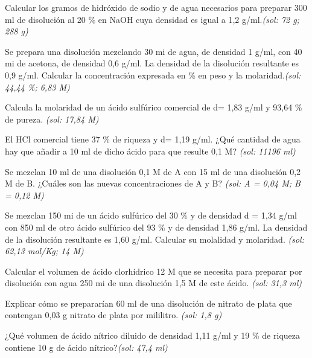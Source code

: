 \begin{multicols}{2}
\begin{problem}
Calcular los gramos de hidróxido de sodio y de agua necesarios para preparar 300 ml de disolución al 20 \% en NaOH cuya densidad es igual a 1,2 g/ml.\textit{\scriptsize(sol: 72 g; 288 g)}	
\end{problem}
\begin{problem}
Se prepara una disolución mezclando 30 mi de agua, de densidad 1 g/ml, con 40 mi de acetona, de densidad 0,6 g/ml. La densidad de la disolución resultante es 0,9 g/ml. Calcular la concentración expresada en \% en peso y la molaridad.\textit{\scriptsize(sol: 44,44 \%; 6,83 M)}
\end{problem}
\begin{problem}
Calcula la molaridad de un ácido sulfúrico comercial de d= 1,83 g/ml y 93,64 \% de pureza. \textit{\scriptsize(sol: 17,84 M)}
\end{problem}
\begin{problem}
El HCl comercial tiene 37 \% de riqueza y d= 1,19 g/ml. ¿Qué cantidad de agua hay que añadir a 10 ml de dicho ácido para que resulte 0,1 M? \textit{\scriptsize(sol: 11196 ml)}
\end{problem}
\begin{problem}
Se mezclan 10 ml de una disolución 0,1 M de A con 15 ml de una disolución 0,2 M de B. ¿Cuáles son las nuevas concentraciones de A y B? \textit{\scriptsize(sol: A = 0,04 M; B = 0,12 M)}	
\end{problem}
\begin{problem}
Se mezclan 150 mi de un ácido sulfúrico del 30 \% y de densidad d = 1,34 g/ml con 850 ml de otro ácido sulfúrico del 93 \% y de densidad 1,86 g/ml. La densidad de la disolución resultante es 1,60 g/ml. Calcular su molalidad y molaridad. \textit{\scriptsize(sol: 62,13 mol/Kg; 14 M)}	
\end{problem}
\begin{problem}
Calcular el volumen de ácido clorhídrico 12 M que se necesita para preparar por disolución con agua 250 mi de una disolución 1,5 M de este ácido. \textit{\scriptsize(sol: 31,3 ml)}
\end{problem}
\begin{problem}
Explicar cómo se prepararían 60 ml de una disolución de nitrato de plata que contengan 0,03 g nitrato de plata por mililitro. \textit{\scriptsize(sol: 1,8 g)}
\end{problem}
\begin{problem}
¿Qué volumen de ácido nítrico diluido de densidad 1,11 g/ml y 19 \% de riqueza contiene 10 g de ácido nítrico?\textit{\scriptsize(sol: 47,4 ml)}

\end{problem}
\end{multicols}
